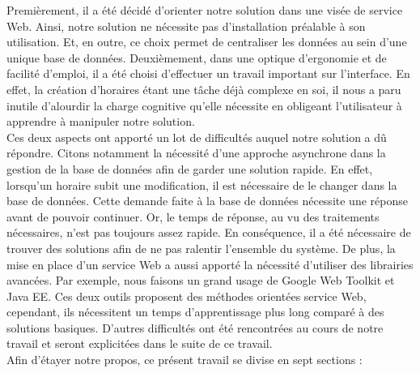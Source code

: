\newline
\indent
Premièrement, il a été décidé d'orienter notre solution dans une visée de service Web. Ainsi, notre solution ne nécessite pas d'installation préalable à son utilisation. Et, en outre, ce choix permet de centraliser les données au sein d'une unique base de données.
\newline
\indent
Deuxièmement, dans une optique d'ergonomie et de facilité d'emploi, il a été choisi d'effectuer un travail important sur l'interface. En effet, la création d'horaires étant une tâche déjà complexe en soi, il nous a paru inutile d'alourdir la charge cognitive qu'elle nécessite en obligeant l'utilisateur à apprendre à manipuler notre solution.\\
\newline
\indent
Ces deux aspects ont apporté un lot de difficultés auquel notre solution a dû répondre. Citons notamment la nécessité d'une approche asynchrone dans la gestion de la base de données afin de garder une solution rapide. En effet, lorsqu'un horaire subit une modification, il est nécessaire de le changer dans la base de données. Cette demande faite à la base de données nécessite une réponse avant de pouvoir continuer. Or, le temps de réponse, au vu des traitements nécessaires, n'est pas toujours  assez rapide. En conséquence, il a été nécessaire de trouver des solutions afin de ne pas ralentir l'ensemble du système.
\newline
\indent
De plus, la mise en place d'un service Web a aussi apporté la nécessité d'utiliser des librairies avancées. Par exemple, nous faisons un grand usage de Google Web Toolkit et Java EE. Ces deux outils proposent des méthodes orientées service Web, cependant, ils nécessitent un temps d'apprentissage plus long comparé à des solutions basiques.
\newline
\indent
D'autres difficultés ont été rencontrées au cours de notre travail et seront explicitées dans le suite de ce travail.\\
\newline
\indent
Afin d'étayer notre propos, ce présent travail se divise en sept sections :
